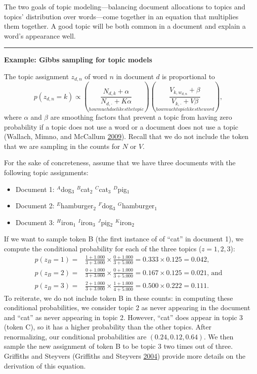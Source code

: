 \documentclass[]{krantz}
\begin{document}
The two goals of topic modeling---balancing document allocations to
topics and topics' distribution over words---come together in an
equation that multiplies them together. A good topic will be both common
in a document and explain a word's appearance well.

\begin{center}\rule{0.5\linewidth}{\linethickness}\end{center}

\textbf{Example: Gibbs sampling for topic models}

The topic assignment \(z_{d,n}\) of word \(n\) in document \(d\) is
proportional to
\[p(z_{d,n}=k) \propto \left( \underset{how much doc likes the topic}{\frac{N_{d,k} + \alpha}{N_{d, \cdot} + K \alpha}} \right) \left(\underset{how much topic likes the word}{\frac{V_{k,w_{d,n}} + \beta}{V_{k, \cdot} + V \beta}} \right),\]
where \(\alpha\) and \(\beta\) are smoothing factors that prevent a
topic from having zero probability if a topic does not use a word or a
document does not use a topic (Wallach, Mimno, and McCallum
\protect\hyperlink{ref-wallach-09b}{2009}). Recall that we do not
include the token that we are sampling in the counts for \(N\) or \(V\).

For the sake of concreteness, assume that we have three documents with
the following topic assignments:

\begin{itemize}
\item
  Document 1: \(^A\)dog\(_3\) \(^B\)cat\(_2\) \(^C\)cat\(_3\)
  \(^D\)pig\(_1\)
\item
  Document 2: \(^E\)hamburger\(_2\) \(^F\)dog\(_3\)
  \(^G\)hamburger\(_1\)
\item
  Document 3: \(^H\)iron\(_1\) \(^I\)iron\(_3\) \(^J\)pig\(_2\)
  \(^K\)iron\(_2\)
\end{itemize}

If we want to sample token B (the first instance of of ``cat'' in
document 1), we compute the conditional probability for each of the
three topics (\(z=1,2,3\)): \[\begin{aligned}
p(z_B = 1) = & \frac{1 + 1.000}{3 + 3.000} \times \frac{0
    + 1.000}{3 + 5.000} = 0.333 \times 0.125 = 0.042, \\[4pt]
p(z_B = 2) = & \frac{0 + 1.000}{3 + 3.000} \times \frac{0
    + 1.000}{3 + 5.000} = 0.167 \times 0.125 = 0.021\mbox{, and} \\[4pt]
p(z_B = 3) = & \frac{2 + 1.000}{3 + 3.000} \times \frac{1 + 1.000}{4 + 5.000} = 0.500 \times 0.222 = 0.111.\end{aligned}\]
To reiterate, we do not include token B in these counts: in computing
these conditional probabilities, we consider topic 2 as never appearing
in the document and ``cat'' as never appearing in topic 2. However,
``cat'' does appear in topic 3 (token C), so it has a higher probability
than the other topics. After renormalizing, our conditional
probabilities are \((0.24, 0.12, 0.64)\). We then sample the new
assignment of token B to be topic 3 two times out of three. Griffiths
and Steyvers (Griffiths and Steyvers
\protect\hyperlink{ref-griffiths-04}{2004}) provide more details on the
derivation of this equation.
\end{document}
